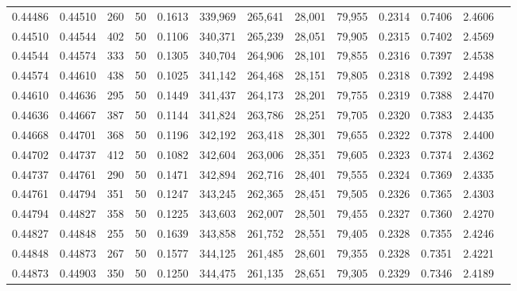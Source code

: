 \begin{tabular}{rrrrrrrrrrrrr}
0.44486 & 0.44510 &   260 &  50 &                                     0.1613 & 339,969 & 265,641 &  28,001 &  79,955 & 0.2314 & 0.7406 & 2.4606 \\
0.44510 & 0.44544 &   402 &  50 &                                     0.1106 & 340,371 & 265,239 &  28,051 &  79,905 & 0.2315 & 0.7402 & 2.4569 \\
0.44544 & 0.44574 &   333 &  50 &                                     0.1305 & 340,704 & 264,906 &  28,101 &  79,855 & 0.2316 & 0.7397 & 2.4538 \\
0.44574 & 0.44610 &   438 &  50 &                                     0.1025 & 341,142 & 264,468 &  28,151 &  79,805 & 0.2318 & 0.7392 & 2.4498 \\
0.44610 & 0.44636 &   295 &  50 &                                     0.1449 & 341,437 & 264,173 &  28,201 &  79,755 & 0.2319 & 0.7388 & 2.4470 \\
0.44636 & 0.44667 &   387 &  50 &                                     0.1144 & 341,824 & 263,786 &  28,251 &  79,705 & 0.2320 & 0.7383 & 2.4435 \\
0.44668 & 0.44701 &   368 &  50 &                                     0.1196 & 342,192 & 263,418 &  28,301 &  79,655 & 0.2322 & 0.7378 & 2.4400 \\
0.44702 & 0.44737 &   412 &  50 &                                     0.1082 & 342,604 & 263,006 &  28,351 &  79,605 & 0.2323 & 0.7374 & 2.4362 \\
0.44737 & 0.44761 &   290 &  50 &                                     0.1471 & 342,894 & 262,716 &  28,401 &  79,555 & 0.2324 & 0.7369 & 2.4335 \\
0.44761 & 0.44794 &   351 &  50 &                                     0.1247 & 343,245 & 262,365 &  28,451 &  79,505 & 0.2326 & 0.7365 & 2.4303 \\
0.44794 & 0.44827 &   358 &  50 &                                     0.1225 & 343,603 & 262,007 &  28,501 &  79,455 & 0.2327 & 0.7360 & 2.4270 \\
0.44827 & 0.44848 &   255 &  50 &                                     0.1639 & 343,858 & 261,752 &  28,551 &  79,405 & 0.2328 & 0.7355 & 2.4246 \\
0.44848 & 0.44873 &   267 &  50 &                                     0.1577 & 344,125 & 261,485 &  28,601 &  79,355 & 0.2328 & 0.7351 & 2.4221 \\
0.44873 & 0.44903 &   350 &  50 &                                     0.1250 & 344,475 & 261,135 &  28,651 &  79,305 & 0.2329 & 0.7346 & 2.4189 \\

\end{tabular}
